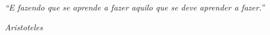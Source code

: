 \newpage

\vspace*{10cm}
\hspace{4cm}\begin{minipage}{.51\textwidth}

\textit{``E fazendo que se aprende a fazer aquilo que se deve aprender a fazer.'' }

\begin{flushright}\itshape Aristoteles \upshape\end{flushright}

\end{minipage}